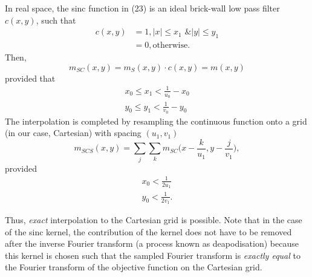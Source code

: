 In real space, the sinc function in (23) is an ideal brick-wall low pass filter $c(x,y)$, such that
\begin{align}
c(x,y) &= 1, |x| \leq x_1 \text{ \& } |y| \leq y_1 \\
&= 0, \text{otherwise}.
\end{align}
Then, 
\begin{equation}
m_{SC}(x,y) = m_{S}(x,y) \cdot c(x,y) = m(x,y)
\end{equation}
provided that
\begin{align}
x_0 \leq x_1 < \frac{1}{u_0} - x_0 \\
y_0 \leq y_1 < \frac{1}{v_0} - y_0
\end{align}
The interpolation is completed by resampling the continuous function onto a grid (in our case, Cartesian) with spacing $(u_1, v_1)$
\begin{equation}
m_{SCS}(x,y)=\sum_j \sum_k m_{SC}\Big(x - \frac{k}{u_1}, y - \frac{j}{v_1}\Big),
\end{equation}
provided \begin{align}
x_0 < \frac{1}{2u_1}\\
y_0 < \frac{1}{2v_1}.
\end{align}

Thus, \emph{exact} interpolation to the Cartesian grid is possible. Note that in the case of the sinc kernel, the contribution of the kernel does not have to be removed after the inverse Fourier transform (a process known as deapodisation) because this kernel is chosen such that the sampled Fourier transform is \emph{exactly equal} to the Fourier transform of the objective function on the Cartesian grid.

